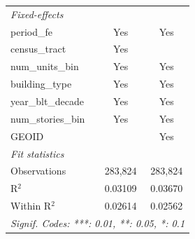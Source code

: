 \begin{tabular}{lcc}
   \midrule
   \emph{Fixed-effects}\\
   period\_fe                                                          & Yes                   & Yes\\  
   census\_tract                                                       & Yes                   & \\  
   num\_units\_bin                                                     & Yes                   & Yes\\  
   building\_type                                                      & Yes                   & Yes\\  
   year\_blt\_decade                                                   & Yes                   & Yes\\  
   num\_stories\_bin                                                   & Yes                   & Yes\\  
   GEOID                                                               &                       & Yes\\  
   \midrule
   \emph{Fit statistics}\\
   Observations                                                        & 283,824               & 283,824\\  
   R$^2$                                                               & 0.03109               & 0.03670\\  
   Within R$^2$                                                        & 0.02614               & 0.02562\\  
   \midrule \midrule
   \multicolumn{3}{l}{\emph{Signif. Codes: ***: 0.01, **: 0.05, *: 0.1}}\\
\end{tabular}
\par\endgroup
